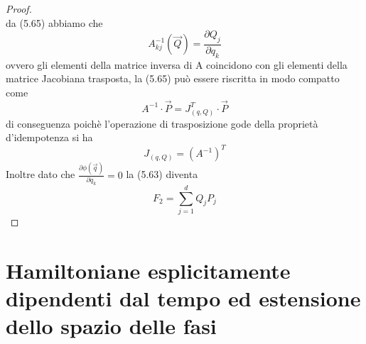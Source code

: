 \begin{proof}
\begin{equation}
\end{equation}
da (5.65) abbiamo che 
\begin{equation}
	A^{-1}_{kj}(\vec{Q}) = \frac{\partial Q_j}{\partial q_k}
\end{equation}
ovvero gli elementi della matrice inversa di A coincidono con gli elementi della matrice Jacobiana trasposta, la (5.65) pu\`{o} essere riscritta in modo compatto come
\begin{equation}
	A^{-1} \cdot \vec{P} = J_{(q,Q)}^{T} \cdot \vec{P}
\end{equation}
di conseguenza poich\`{e} l'operazione di trasposizione gode della propriet\`{a} d'idempotenza si ha 
\begin{equation}
	J_{(q,Q)} = (A^{-1})^{T}
\end{equation}
Inoltre dato che $\frac{\partial \phi(\vec {q})}{\partial q_k} = 0$ la (5.63) diventa 
\begin{equation}
	F_2 = \sum_{j=1}^{d} Q_jP_j
\end{equation}
\end{proof}

\section{Hamiltoniane esplicitamente dipendenti dal tempo ed estensione dello spazio delle fasi}

